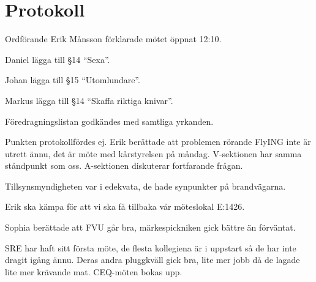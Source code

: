 \documentclass[10pt]{article}
\def\mo{Erik Månsson}
\begin{document}
\section*{Protokoll}
\begin{paragrafer}
Ordförande {\mo} förklarade mötet öppnat 12:10.

{\valavmo}

{\valavms}

{\valavj}

{\tosg}

{\ingaadj}


Daniel \ypa lägga till \S14 ``Sexa''.

Johan \ypa lägga till \S15 ``Utomlundare''.

Markus \ypa lägga till \S14 ``Skaffa riktiga knivar''.

Föredragningslistan godkändes med samtliga yrkanden.

{}
\begin{fyllnadsval} %
\end{fyllnadsval}
\begin{paragrafer}
Punkten protokollfördes ej.
Erik berättade att problemen rörande FlyING inte är utrett ännu, det är möte med kårstyrelsen på måndag. V-sektionen har samma ståndpunkt som oss. A-sektionen diskuterar fortfarande frågan.

Tillsynsmyndigheten var i edekvata, de hade synpunkter på brandvägarna.

Erik ska kämpa för att vi ska få tillbaka vår möteslokal E:1426.

Sophia berättade att FVU går bra, märkespickniken gick bättre än förväntat.

SRE har haft sitt första möte, de flesta kollegiena är i uppstart så de har inte dragit igång ännu. Deras andra pluggkväll gick bra, lite mer jobb då de lagade lite mer krävande mat. CEQ-möten bokas upp.


\end{paragrafer}
\end{paragrafer}
\end{document}
